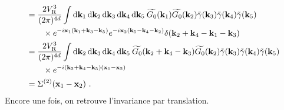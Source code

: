 \begin{align}
&=\frac{2V_{\mathrm{R}}^3}{(2\pi)^{4d}} \int{\mathop{}\mathopen{}\mathrm{d}\mathbf{k}_{\mathrm{1}}\mathop{}\mathopen{}\mathrm{d}\mathbf{k}_{\mathrm{2}}\mathop{}\mathopen{}\mathrm{d}\mathbf{k}_{\mathrm{3}}\mathop{}\mathopen{}\mathrm{d}\mathbf{k}_{\mathrm{4}}\mathop{}\mathopen{}\mathrm{d}\mathbf{k}_{\mathrm{5}}\: \widetilde{G_0}(\mathbf{k}_{\mathrm{1}}) \widetilde{G_0}(\mathbf{k}_{\mathrm{2}}) \tilde{\gamma}(\mathbf{k}_{\mathrm{3}})\tilde{\gamma}(\mathbf{k}_{\mathrm{4}})\tilde{\gamma}(\mathbf{k}_{\mathrm{5}})}\\
&\nonumber \qquad \times e^{-i\mathbf{x}_{\mathrm{1}} (\mathbf{k}_{\mathrm{1}}+\mathbf{k}_{\mathrm{3}}-\mathbf{k}_{\mathrm{5}})} e^{-i\mathbf{x}_{\mathrm{2}}(\mathbf{k}_{\mathrm{5}}-\mathbf{k}_{\mathrm{4}}-\mathbf{k}_{\mathrm{2}})} \delta(\mathbf{k}_{\mathrm{2}} +\mathbf{k}_{\mathrm{4}} -\mathbf{k}_{\mathrm{1}} -\mathbf{k}_{\mathrm{3}}) \\
&= \frac{2V_{\mathrm{R}}^3}{(2\pi)^{4d}} \int{\mathop{}\mathopen{}\mathrm{d}\mathbf{k}_{\mathrm{2}}\mathop{}\mathopen{}\mathrm{d}\mathbf{k}_{\mathrm{3}}\mathop{}\mathopen{}\mathrm{d}\mathbf{k}_{\mathrm{4}}\mathop{}\mathopen{}\mathrm{d}\mathbf{k}_{\mathrm{5}}\: \widetilde{G_0}(\mathbf{k}_{\mathrm{2}}+\mathbf{k}_{\mathrm{4}}-\mathbf{k}_{\mathrm{3}}) \widetilde{G_0}(\mathbf{k}_{\mathrm{2}})\tilde{\gamma}(\mathbf{k}_{\mathrm{3}})\tilde{\gamma}(\mathbf{k}_{\mathrm{4}})\tilde{\gamma}(\mathbf{k}_{\mathrm{5}})} \\
&\nonumber \qquad \times e^{-i(\mathbf{k}_{\mathrm{2}}+\mathbf{k}_{\mathrm{4}}-\mathbf{k}_{\mathrm{5}})(\mathbf{x}_{\mathrm{1}}-\mathbf{x}_{\mathrm{2}})}\\
&=\Sigma^{(2)}(\mathbf{x}_{\mathrm{1}}-\mathbf{x}_{\mathrm{2}}) \text{ .}
\end{align}
Encore une fois, on retrouve l'invariance par translation.

